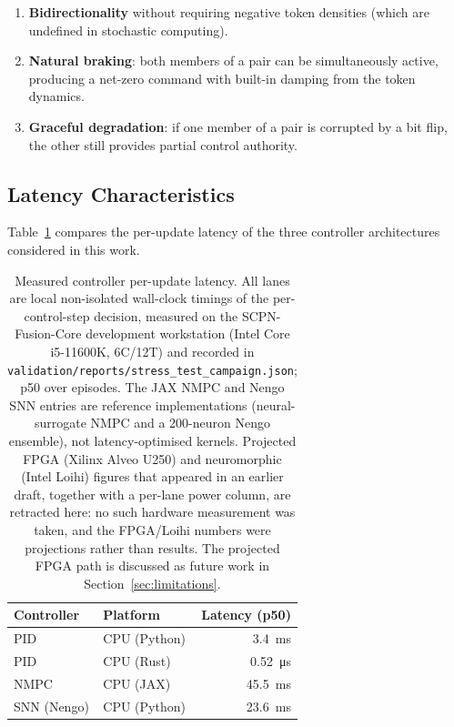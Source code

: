 \documentclass[12pt]{article}
\begin{document}
\begin{enumerate}
  \item \textbf{Bidirectionality} without requiring negative token
    densities (which are undefined in stochastic computing).
  \item \textbf{Natural braking}: both members of a pair can be
    simultaneously active, producing a net-zero command with built-in
    damping from the token dynamics.
  \item \textbf{Graceful degradation}: if one member of a pair is
    corrupted by a bit flip, the other still provides partial control
    authority.
\end{enumerate}

\subsection{Latency Characteristics}

Table~\ref{tab:latency} compares the per-update latency of the three
controller architectures considered in this work.

\begin{table}[htbp]
\centering
\caption{Measured controller per-update latency.  All lanes are local
non-isolated wall-clock timings of the per-control-step decision, measured on
the SCPN-Fusion-Core development workstation (Intel Core i5-11600K, 6C/12T) and
recorded in \texttt{validation/reports/stress\_test\_campaign.json}; p50 over
episodes.  The JAX NMPC and Nengo SNN entries are reference implementations
(neural-surrogate NMPC and a 200-neuron Nengo ensemble), not latency-optimised
kernels.  Projected FPGA (Xilinx Alveo U250) and neuromorphic (Intel Loihi)
figures that appeared in an earlier draft, together with a per-lane power
column, are retracted here: no such hardware measurement was taken, and the
FPGA/Loihi numbers were projections rather than results.  The projected FPGA
path is discussed as future work in Section~\ref{sec:limitations}.}
\label{tab:latency}
\begin{tabular}{llr}
\toprule
Controller & Platform & Latency (p50) \\
\midrule
PID          & CPU (Python)  & \SI{3.4}{\milli\second}  \\
PID          & CPU (Rust)    & \SI{0.52}{\micro\second} \\
NMPC         & CPU (JAX)     & \SI{45.5}{\milli\second} \\
SNN (Nengo)  & CPU (Python)  & \SI{23.6}{\milli\second} \\
\bottomrule
\end{tabular}
\end{table}
\end{document}
